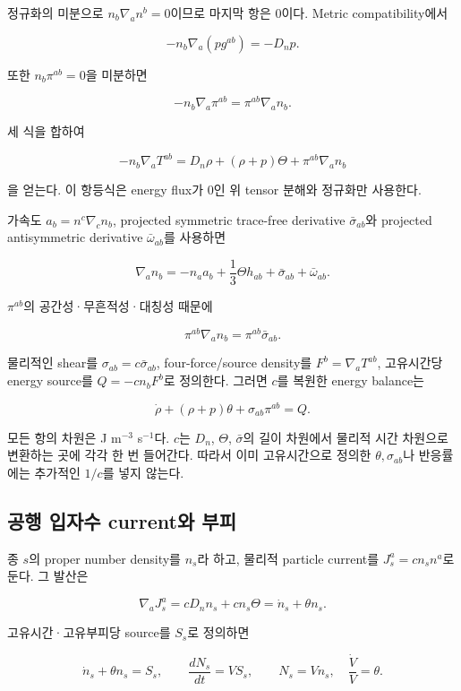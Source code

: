 \documentclass[11pt,a4paper]{article}
\begin{document}
정규화의 미분으로 \(n_b\nabla_an^b=0\)이므로 마지막 항은 0이다. Metric compatibility에서

\[
-n_b\nabla_a(p g^{ab})=-D_np.
\]

또한 \(n_b\pi^{ab}=0\)을 미분하면

\[
-n_b\nabla_a\pi^{ab}
=\pi^{ab}\nabla_an_b.
\]

세 식을 합하여

\[
\boxed{
-n_b\nabla_aT^{ab}
=D_n\rho+(\rho+p)\Theta+\pi^{ab}\nabla_an_b
}
\tag{CG.1}
\]

을 얻는다. 이 항등식은 energy flux가 0인 위 tensor 분해와 정규화만 사용한다.

가속도 \(a_b=n^c\nabla_cn_b\), projected symmetric trace-free derivative \(\bar\sigma_{ab}\)와 projected antisymmetric derivative \(\bar\omega_{ab}\)를 사용하면

\[
\nabla_an_b=-n_aa_b+\frac13\Theta h_{ab}
+\bar\sigma_{ab}+\bar\omega_{ab}.
\]

\(\pi^{ab}\)의 공간성·무흔적성·대칭성 때문에

\[
\pi^{ab}\nabla_an_b=\pi^{ab}\bar\sigma_{ab}.
\]

물리적인 shear를 \(\sigma_{ab}=c\bar\sigma_{ab}\), four-force/source density를 \(F^b=\nabla_aT^{ab}\), 고유시간당 energy source를 \(Q=-c n_bF^b\)로 정의한다. 그러면 \(c\)를 복원한 energy balance는

\[
\boxed{
\dot\rho+(\rho+p)\theta+\sigma_{ab}\pi^{ab}=Q.
}
\tag{CG.2}
\]

모든 항의 차원은 J m\(^{-3}\) s\(^{-1}\)다. \(c\)는 \(D_n\), \(\Theta\), \(\bar\sigma\)의 길이 차원에서 물리적 시간 차원으로 변환하는 곳에 각각 한 번 들어간다. 따라서 이미 고유시간으로 정의한 \(\theta,\sigma_{ab}\)나 반응률에는 추가적인 \(1/c\)를 넣지 않는다.

\hypertarget{uxacf5uxd589-uxc785uxc790uxc218-currentuxc640-uxbd80uxd53c}{%
\subsection{공행 입자수 current와 부피}\label{uxacf5uxd589-uxc785uxc790uxc218-currentuxc640-uxbd80uxd53c}}

종 \(s\)의 proper number density를 \(n_s\)라 하고, 물리적 particle current를 \(J_s^a=c n_s n^a\)로 둔다. 그 발산은

\[
\nabla_aJ_s^a
=cD_nn_s+c n_s\Theta
=\dot n_s+\theta n_s.
\]

고유시간·고유부피당 source를 \(S_s\)로 정의하면

\[
\boxed{
\dot n_s+\theta n_s=S_s,\qquad
\frac{dN_s}{dt}=V S_s,\qquad N_s=Vn_s,\quad \frac{\dot V}{V}=\theta.
}
\tag{CG.3}
\]
\end{document}
